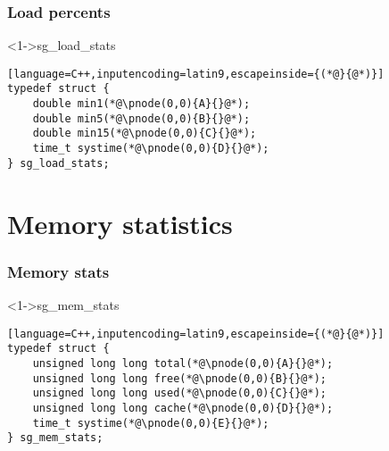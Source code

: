\documentclass[ngerman,xcolor={table,dvipsnames},smaller,compress,hyperref={bookmarks,colorlinks}]{beamer}
\begin{document}
\begin{frame}[fragile]
\frametitle{Load percents}
\begin{block}<1->{sg\_load\_stats}
\tiny
\begin{lstlisting}[language=C++,inputencoding=latin9,escapeinside={(*@}{@*)}]
typedef struct {
    double min1(*@\pnode(0,0){A}{}@*);
    double min5(*@\pnode(0,0){B}{}@*);
    double min15(*@\pnode(0,0){C}{}@*);
    time_t systime(*@\pnode(0,0){D}{}@*);
} sg_load_stats;
\end{lstlisting}
\end{block}

\scriptsize
\begin{itemize}
\end{itemize}
\end{frame}

\section{Memory statistics}

\begin{frame}[fragile]
\frametitle{Memory stats}
\begin{block}<1->{sg\_mem\_stats}
\tiny
\begin{lstlisting}[language=C++,inputencoding=latin9,escapeinside={(*@}{@*)}]
typedef struct {
    unsigned long long total(*@\pnode(0,0){A}{}@*);
    unsigned long long free(*@\pnode(0,0){B}{}@*);
    unsigned long long used(*@\pnode(0,0){C}{}@*);
    unsigned long long cache(*@\pnode(0,0){D}{}@*);
    time_t systime(*@\pnode(0,0){E}{}@*);
} sg_mem_stats;
\end{lstlisting}
\end{block}

\scriptsize
\begin{itemize}
\end{itemize}
\end{frame}
\end{document}
